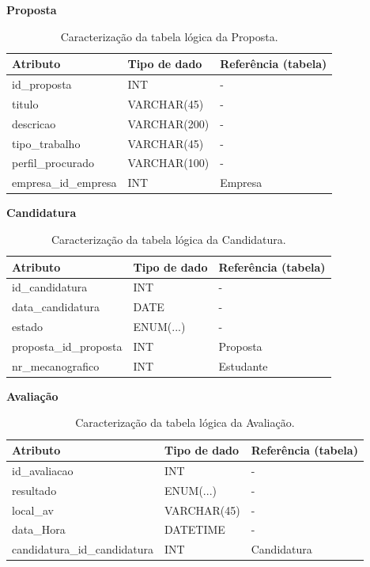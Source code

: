 \documentclass[12pt,a4paper]{article}
\renewcommand{\arraystretch}{1.5}  %
\begin{document}
\begin{table}[H]
\textbf{Proposta}

\centering
\renewcommand{\arraystretch}{1.2}
\begin{tabularx}{\textwidth}{|X|l|X|}
\hline
\textbf{Atributo} & \textbf{Tipo de dado} & \textbf{Referência (tabela)} \\ \hline

id\_proposta & INT & - \\ \hline
titulo & VARCHAR(45) & - \\ \hline
descricao & VARCHAR(200) & - \\ \hline
tipo\_trabalho & VARCHAR(45) & - \\ \hline
perfil\_procurado & VARCHAR(100) & - \\ \hline
empresa\_id\_empresa & INT & Empresa \\ \hline

\end{tabularx}
\caption{Caracterização da tabela lógica da Proposta.}
\end{table}

\begin{table}[H]
\textbf{Candidatura}

\centering
\renewcommand{\arraystretch}{1.2}
\begin{tabularx}{\textwidth}{|X|l|X|}
\hline
\textbf{Atributo} & \textbf{Tipo de dado} & \textbf{Referência (tabela)} \\ \hline

id\_candidatura & INT & - \\ \hline
data\_candidatura & DATE & - \\ \hline
estado & ENUM(...) & - \\ \hline
proposta\_id\_proposta & INT & Proposta \\ \hline
nr\_mecanografico & INT & Estudante \\ \hline

\end{tabularx}
\caption{Caracterização da tabela lógica da Candidatura.}
\end{table}



\begin{table}[H]
\textbf{Avaliação}

\centering
\renewcommand{\arraystretch}{1.2}
\begin{tabularx}{\textwidth}{|X|l|X|}
\hline
\textbf{Atributo} & \textbf{Tipo de dado} & \textbf{Referência (tabela)} \\ \hline

id\_avaliacao & INT & - \\ \hline
resultado & ENUM(...) & - \\ \hline
local\_av & VARCHAR(45) & - \\ \hline
data\_Hora & DATETIME & - \\ \hline
candidatura\_id\_candidatura & INT & Candidatura \\ \hline

\end{tabularx}
\caption{Caracterização da tabela lógica da Avaliação.}
\end{table}
\end{document}
